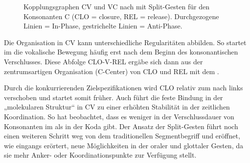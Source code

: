 \begin{figure}

	\caption{Kopplungsgraphen CV und VC nach \citet{Nam2007a} mit Split-Gesten für den Konsonanten C (CLO = closure, REL = release). Durchgezogene Linien = In-Phase, gestrichelte Linien = Anti-Phase.}
	\label{figure:0723}
\end{figure}

Die Organisation in CV kann unterschiedliche Regularitäten abbilden. So startet im  die vokalische Bewegung häufig erst nach dem Beginn des konsonantischen Verschlusses. Diese Abfolge CLO-V-REL ergäbe sich dann aus der zentrumsartigen Organisation (C-Center) von CLO und REL mit dem .

Durch die konkurrierenden Zielspezifikationen wird CLO relativ zum  nach links verschoben und startet somit früher. Auch führt die feste Bindung in der „molekularen Struktur“ in CV zu einer erhöhten Stabilität in der zeitlichen Koordination. So hat \citet{Byrd1996b} beobachtet, dass es weniger  in der Verschlussdauer von Konsonanten im  als in der Koda gibt. Der Ansatz der Split-Gesten führt noch einen weiteren Schritt weg von dem traditionellen Segmentbegriff \citep{Pouplier2011a} und eröffnet, wie eingangs erörtert, neue Möglichkeiten in der  oraler und glottaler Gesten, da sie mehr Anker- oder Koordinationspunkte zur Verfügung stellt.
